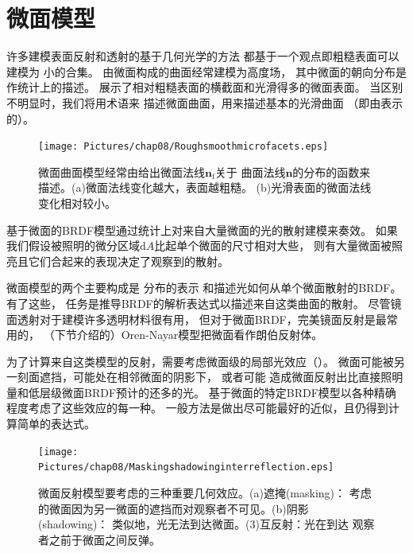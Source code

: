 \section{微面模型}\label{sec:微面模型}

许多建模表面反射和透射的基于几何光学的方法
都基于一个观点即粗糙表面可以建模为
小的合集。
由微面构成的曲面经常建模为高度场，
其中微面的朝向分布是作统计上的描述。
展示了相对粗糙表面的横截面和光滑得多的微面表面。
当区别不明显时，我们将用术语来
描述微面曲面，用来描述基本的光滑曲面
（即由表示的）。
\begin{figure}[htbp]
    \centering
    \texttt{[image: Pictures/chap08/Roughsmoothmicrofacets.eps]}
    \caption{微面曲面模型经常由给出微面法线${\bm n}_{\mathrm{f}}$关于
        曲面法线$\bm n$的分布的函数来描述。(a)微面法线变化越大，表面越粗糙。
        (b)光滑表面的微面法线变化相对较小。}
    \label{fig:8.12}
\end{figure}

基于微面的BRDF模型通过统计上对来自大量微面的光的散射建模来奏效。
如果我们假设被照明的微分区域$\mathrm{d}A$比起单个微面的尺寸相对大些，
则有大量微面被照亮且它们合起来的表现决定了观察到的散射。

微面模型的两个主要构成是
分布的表示
和描述光如何从单个微面散射的BRDF。有了这些，
任务是推导BRDF的解析表达式以描述来自这类曲面的散射。
尽管镜面透射对于建模许多透明材料很有用，
但对于微面BRDF，完美镜面反射是最常用的，
（下节介绍的）Oren-Nayar模型把微面看作朗伯反射体。

为了计算来自这类模型的反射，需要考虑微面级的局部光效应（）。
微面可能被另一刻面遮挡，可能处在相邻微面的阴影下，
或者可能
造成微面反射出比直接照明量和低层级微面BRDF预计的还多的光。
基于微面的特定BRDF模型以各种精确程度考虑了这些效应的每一种。
一般方法是做出尽可能最好的近似，且仍得到计算简单的表达式。
\begin{figure}[htbp]
    \centering
    \texttt{[image: Pictures/chap08/Maskingshadowinginterreflection.eps]}
    \caption{微面反射模型要考虑的三种重要几何效应。(a)遮掩(masking)：
        考虑的微面因为另一微面的遮挡而对观察者不可见。(b)阴影(shadowing)：
        类似地，光无法到达微面。(3)互反射：光在到达
        观察者之前于微面之间反弹。}
    \label{fig:8.13}
\end{figure}


